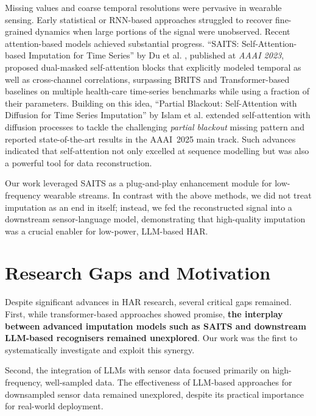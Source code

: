 \hspace{2em}Missing values and coarse temporal resolutions were pervasive in wearable sensing. Early statistical or RNN-based approaches struggled to recover fine-grained dynamics when large portions of the signal were unobserved. Recent attention-based models achieved substantial progress. ``SAITS: Self-Attention-based Imputation for Time Series'' by Du et al. \cite{Du2023SAITS}, published at \textit{AAAI 2023}, proposed dual-masked self-attention blocks that explicitly modeled temporal as well as cross-channel correlations, surpassing BRITS and Transformer-based baselines on multiple health-care time-series benchmarks while using a fraction of their parameters. Building on this idea, ``Partial Blackout: Self-Attention with Diffusion for Time Series Imputation'' by Islam et al. \cite{Islam2025PartialBlackout} extended self-attention with diffusion processes to tackle the challenging \textit{partial blackout} missing pattern and reported state-of-the-art results in the AAAI~2025 main track. Such advances indicated that self-attention not only excelled at sequence modelling but was also a powerful tool for data reconstruction.

\hspace{2em}Our work leveraged SAITS as a plug-and-play enhancement module for low-frequency wearable streams. In contrast with the above methods, we did not treat imputation as an end in itself; instead, we fed the reconstructed signal into a downstream sensor-language model, demonstrating that high-quality imputation was a crucial enabler for low-power, LLM-based HAR.

\section{Research Gaps and Motivation}

\hspace{2em}Despite significant advances in HAR research, several critical gaps remained. First, while transformer-based approaches showed promise, \textbf{the interplay between advanced imputation models such as SAITS and downstream LLM-based recognisers remained unexplored}. Our work was the first to systematically investigate and exploit this synergy.

Second, the integration of LLMs with sensor data focused primarily on high-frequency, well-sampled data. The effectiveness of LLM-based approaches for downsampled sensor data remained unexplored, despite its practical importance for real-world deployment.

